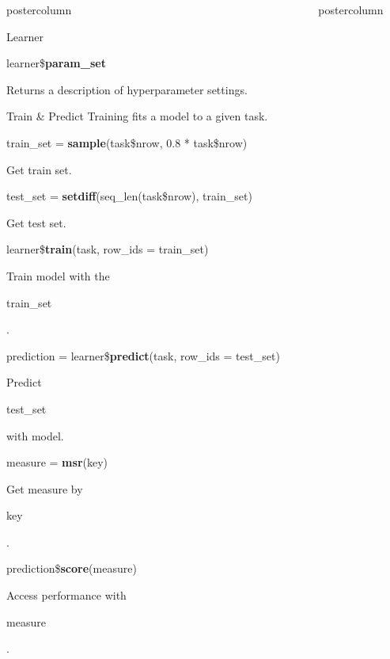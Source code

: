 \documentclass{beamer}
\newlength{\columnheight} %
\newcommand{\codeinline}[1]{\begin{codeboxinline}#1\end{codeboxinline}}
\begin{document}
\begin{frame}[fragile]{}
\begin{columns}
\begin{column}{.245\textwidth}
\begin{beamercolorbox}[center]{postercolumn}
\begin{minipage}{.98\textwidth}
{\begin{myblock}{Learner}
							\\
							\begin{codebox}
								learner\$\textbf{param\_set}
							\end{codebox}
							Returns a description of hyperparameter settings.
						\end{myblock}
						\begin{myblock}{Train \& Predict}
							Training fits a model to a given task.
							\\
							\begin{codebox}
								train\_set = \textbf{sample}(task\$nrow, 0.8 * task\$nrow)
							\end{codebox}
							Get train set.
							\\
							\begin{codebox}
								test\_set = \textbf{setdiff}(seq\_len(task\$nrow), train\_set)
							\end{codebox}
							Get test set.
							\\
							\begin{codebox}
								learner\$\textbf{train}(task, row\_ids = train\_set)
							\end{codebox}
							Train model with the \codeinline{train\_set}.
							\\
							\begin{codebox}
								prediction = learner\$\textbf{predict}(task, row\_ids = test\_set)
							\end{codebox}
							Predict \codeinline{test\_set} with model.
							\\
							\begin{codebox}
								measure = \textbf{msr}(key)
							\end{codebox}
							Get measure by \codeinline{key}.
							\\
							\begin{codebox}
								prediction\$\textbf{score}(measure)
							\end{codebox}
							Access performance with \codeinline{measure}.
						\end{myblock}
					}
				\end{minipage}
			\end{beamercolorbox}
		\end{column}
		\begin{column}{.245\textwidth}
			\begin{beamercolorbox}[center]{postercolumn}
				\begin{minipage}{.98\textwidth}
					\parbox[t][\columnheight]{\textwidth}{
}
\end{minipage}
\end{beamercolorbox}
\end{column}
\end{columns}
\end{frame}
\end{document}

